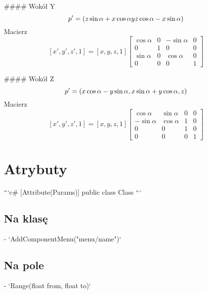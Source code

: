 \documentclass{article}
\begin{document}
#### Wokół Y
$$
p' = (z\sin\alpha + x\cos\alpha\\
y\\
z\cos\alpha - x\sin\alpha)
$$
Macierz
$$
[x', y', z', 1] = [x,y,z,1]
\begin{bmatrix}
    \cos\alpha&0&-\sin\alpha&0\\
    0&1&0&0\\
    \sin\alpha&0&\cos\alpha&0\\
    0&0&0&1
\end{bmatrix}
$$

#### Wokół Z
$$
p' = (x\cos\alpha - y\sin\alpha,\\
x\sin\alpha + y\cos\alpha,\\
z)
$$
Macierz
$$
[x', y', z', 1] = [x,y,z,1]
\begin{bmatrix}
    \cos\alpha&\sin\alpha &0&0\\
    -\sin\alpha & \cos\alpha &1 &0\\
    0&0&1&0\\
    0&0&0&1
\end{bmatrix}
$$

\section{Atrybuty}
```c#
[Attribute(Params)]
public class Class {}
```
\subsection{Na klasę}
- `AddComponentMenu("menu/name")`
\subsection{Na pole}
- `Range(float from, float to)`
\end{document}
